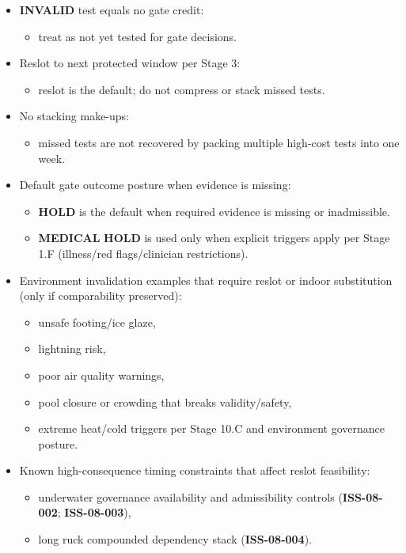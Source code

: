 \documentclass[10pt]{article}
\begin{document}
\begin{itemize}
\item \textbf{INVALID} test equals no gate credit:
\begin{itemize}
\item treat as not yet tested for gate decisions.
\end{itemize}
\item Reslot to next protected window per Stage 3:
\begin{itemize}
\item reslot is the default; do not compress or stack missed tests.
\end{itemize}
\item No stacking make-ups:
\begin{itemize}
\item missed tests are not recovered by packing multiple high-cost tests into one week.
\end{itemize}
\item Default gate outcome posture when evidence is missing:
\begin{itemize}
\item \textbf{HOLD} is the default when required evidence is missing or inadmissible.
\item \textbf{MEDICAL} \textbf{HOLD} is used only when explicit triggers apply per Stage 1.F (illness/red flags/clinician restrictions).
\end{itemize}
\item Environment invalidation examples that require reslot or indoor substitution (only if comparability preserved):
\begin{itemize}
\item unsafe footing/ice glaze,
\item lightning risk,
\item poor air quality warnings,
\item pool closure or crowding that breaks validity/safety,
\item extreme heat/cold triggers per Stage 10.C and environment governance posture.
\end{itemize}
\item Known high-consequence timing constraints that affect reslot feasibility:
\begin{itemize}
\item underwater governance availability and admissibility controls (\textbf{ISS-08-002}; \textbf{ISS-08-003}),
\item long ruck compounded dependency stack (\textbf{ISS-08-004}).
\end{itemize}
\end{itemize}
\end{document}
